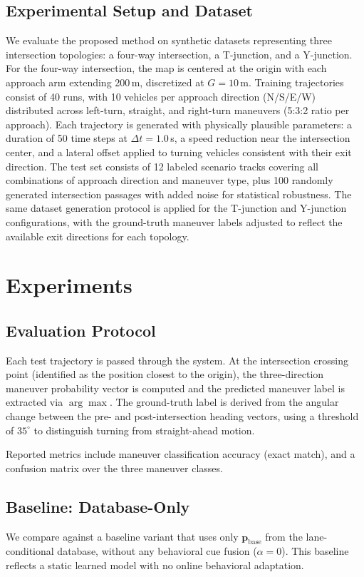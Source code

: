 \documentclass[conference]{IEEEtran}
\begin{document}
\subsection{Experimental Setup and Dataset}
We evaluate the proposed method on synthetic datasets representing three intersection topologies: a four-way intersection, a T-junction, and a Y-junction.
For the four-way intersection, the map is centered at the origin with each approach arm extending 200\,m, discretized at $G = 10$\,m.
Training trajectories consist of 40 runs, with 10 vehicles per approach direction (N/S/E/W) distributed across left-turn, straight, and right-turn maneuvers (5:3:2 ratio per approach).
Each trajectory is generated with physically plausible parameters: a duration of 50 time steps at $\Delta t = 1.0$\,s, a speed reduction near the intersection center, and a lateral offset applied to turning vehicles consistent with their exit direction.
The test set consists of 12 labeled scenario tracks covering all combinations of approach direction and maneuver type, plus 100 randomly generated intersection passages with added noise for statistical robustness.
The same dataset generation protocol is applied for the T-junction and Y-junction configurations, with the ground-truth maneuver labels adjusted to reflect the available exit directions for each topology.

\section{Experiments}
\label{sec:experiments}

\subsection{Evaluation Protocol}
Each test trajectory is passed through the system.
At the intersection crossing point (identified as the position closest to the origin), the three-direction maneuver probability vector is computed and the predicted maneuver label is extracted via $\arg\max$.
The ground-truth label is derived from the angular change between the pre- and post-intersection heading vectors, using a threshold of $35^\circ$ to distinguish turning from straight-ahead motion.

Reported metrics include maneuver classification accuracy (exact match), and a confusion matrix over the three maneuver classes.

\subsection{Baseline: Database-Only}
We compare against a baseline variant that uses only $\mathbf{p}_{\mathrm{base}}$ from the lane-conditional database, without any behavioral cue fusion ($\alpha = 0$).
This baseline reflects a static learned model with no online behavioral adaptation.
\end{document}
